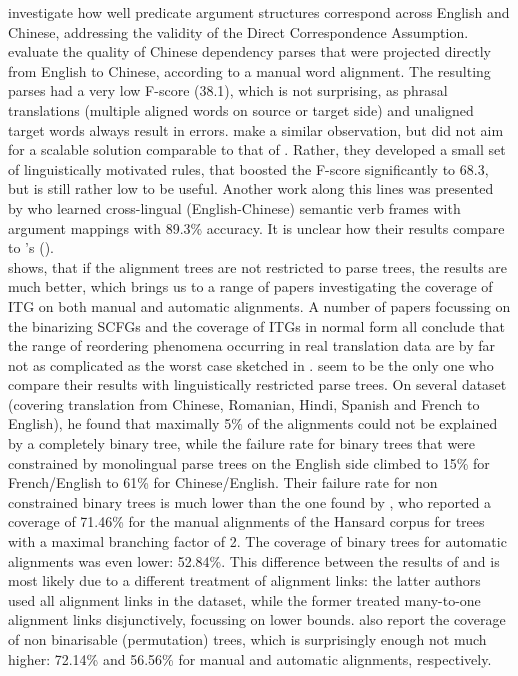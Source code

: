 \documentclass{report}
\theoremstyle{definition}
\theoremstyle{plain}
\def\citepos#1{\citeauthor{#1}'s (\citeyear{#1})}
\begin{document}
\cite{hwa2002evaluating} investigate how well predicate argument structures correspond across English and Chinese, addressing the validity of the Direct Correspondence Assumption. \citeauthor{hwa2002evaluating} evaluate the quality of Chinese dependency parses that were projected directly from English to Chinese, according to a manual word alignment. The resulting parses had a very low F-score (38.1), which is not surprising, as phrasal translations (multiple aligned words on source or target side) and unaligned target words always result in errors. \cite{hwa2002evaluating} make a similar observation, but did not aim for a scalable solution comparable to that of \citeauthor{fox2002phrasal}. Rather, they developed a small set of linguistically motivated rules, that boosted the F-score significantly to 68.3, but is still rather low to be useful. Another work along this lines was presented by \cite{fung2006automatic} who learned cross-lingual (English-Chinese) semantic verb frames with argument mappings with 89.3\% accuracy. It is unclear how their results compare to \citepos{hwa2002evaluating}.\\
\cite{wellington2006empirical} shows, that if the alignment trees are not restricted to parse trees, the results are much better, which brings us to a range of papers investigating the coverage of ITG on both manual and automatic alignments. A number of papers focussing on the binarizing SCFGs \citep{zhang2006synchronous,huang2009binarization} and the coverage of ITGs in normal form \citep{sogaard2009empirical1,sogaard2009empirical2,sogaard2010can} all conclude that the range of reordering phenomena occurring in real translation data are by far not as complicated as the worst case sketched in \cite{satta2005some}. \cite{wellington2006empirical} seem to be the only one who compare their results with linguistically restricted parse trees. On several dataset (covering translation from Chinese, Romanian, Hindi, Spanish and French to English), he found that maximally 5\% of the alignments could not be explained by a completely binary tree, while the failure rate for binary trees that were constrained by monolingual parse trees on the English side climbed to 15\% for French/English to 61\% for Chinese/English. Their failure rate for non constrained binary trees is much lower than the one found by \cite{simaan2013hats}, who reported a coverage of 71.46\% for the manual alignments of the Hansard corpus for trees with a maximal branching factor of 2. The coverage of binary trees for automatic alignments was even lower: 52.84\%. This difference between the results of \cite{wellington2006empirical} and \cite{simaan2013hats} is most likely due to a different treatment of alignment links: the latter authors used all alignment links in the dataset, while the former treated many-to-one alignment links disjunctively, focussing on lower bounds. \cite{simaan2013hats} also report the coverage of non binarisable (permutation) trees, which is surprisingly enough not much higher: 72.14\% and 56.56\% for manual and automatic alignments, respectively.
\end{document}
